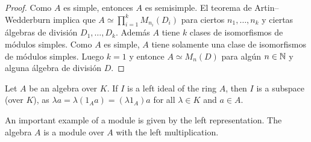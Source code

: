 \begin{proof}
	Como $A$ es simple, entonces $A$ es semisimple. El teorema de Artin--Wedderburn implica que $A\simeq\prod_{i=1}^k M_{n_i}(D_i)$ 
	para ciertos $n_1,\dots,n_k$ y ciertas álgebras de división $D_1,\dots,D_k$. Además $A$ tiene
	$k$ clases de isomorfismos de módulos simples. Como $A$ es simple,
	$A$ tiene solamente una clase de isomorfismos de módulos simples. Luego $k=1$ y entonce
	$A\simeq M_n(D)$ para algún $n\in\mathbb{N}$ y alguna álgebra de división $D$. 
\end{proof}








Let $A$ be an algebra over $K$. If $I$ is a left ideal of the ring $A$, then 
$I$ is a subspace (over $K$), as $\lambda a=\lambda(1_Aa)=(\lambda 1_A)a$ 
for all $\lambda\in K$ and $a\in A$.  



An important example of a module is given by the left representation. The 
algebra $A$ is a module over $A$ with the left multiplication. 

